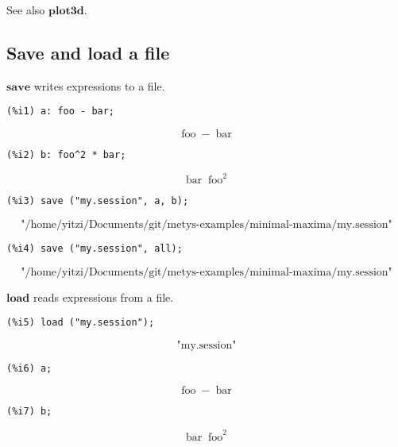 \documentclass[12pt,leqno]{article}
\begin{document}
See also $\mathbf{plot3d}$.

\subsection{Save and load a file}

$\mathbf{save}$ writes expressions to a file.
\begin{verbatim}
(%i1) a: foo - bar;
\end{verbatim}
\begin{dmath}[number={\(\mathop{\mathrm{\%o}_{1}}\)}]
\mathop{\mathrm{foo}}-\mathop{\mathrm{bar}}
\end{dmath}
\begin{verbatim}
(%i2) b: foo^2 * bar;
\end{verbatim}
\begin{dmath}[number={\(\mathop{\mathrm{\%o}_{2}}\)}]
\mathop{\mathrm{bar}} {\mathop{\mathrm{foo}}}^{2}
\end{dmath}
\begin{verbatim}
(%i3) save ("my.session", a, b);
\end{verbatim}
\begin{dmath}[number={\(\mathop{\mathrm{\%o}_{3}}\)}]
\text{"/home/yitzi/Documents/git/metys-examples/minimal-maxima/my.session"}
\end{dmath}
\begin{verbatim}
(%i4) save ("my.session", all);
\end{verbatim}
\begin{dmath}[number={\(\mathop{\mathrm{\%o}_{4}}\)}]
\text{"/home/yitzi/Documents/git/metys-examples/minimal-maxima/my.session"}
\end{dmath}


$\mathbf{load}$ reads expressions from a file.
\begin{verbatim}
(%i5) load ("my.session");
\end{verbatim}
\begin{dmath}[number={\(\mathop{\mathrm{\%o}_{4}}\)}]
\text{"my.session"}
\end{dmath}
\begin{verbatim}
(%i6) a;
\end{verbatim}
\begin{dmath}[number={\(\mathop{\mathrm{\%o}_{5}}\)}]
\mathop{\mathrm{foo}}-\mathop{\mathrm{bar}}
\end{dmath}
\begin{verbatim}
(%i7) b;
\end{verbatim}
\begin{dmath}[number={\(\mathop{\mathrm{\%o}_{6}}\)}]
\mathop{\mathrm{bar}} {\mathop{\mathrm{foo}}}^{2}
\end{dmath}
\end{document}
